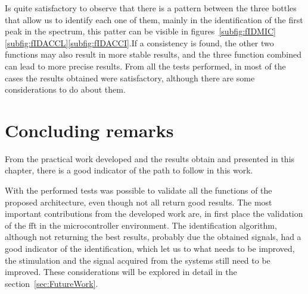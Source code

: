 Is quite satisfactory to observe that there is a pattern between the three bottles that allow us to identify each one of them, mainly in the identification of the first peak in the spectrum, this patter can be visible in figures~\ref{subfig:fIDMIC}\ref{subfig:fIDACCL}\ref{subfig:fIDACCI}.If a consistency is found, the other two functions may also result in more stable results, and the three function combined can lead to more precise results.
From all the tests performed, in most of the cases the results obtained were satisfactory, although there are some considerations to do about them. 

\section{Concluding remarks}
From the practical work developed and the results obtain and presented in this chapter, there is a good indicator of the path to follow in this work.

With the performed tests was possible to validate all the functions of the proposed architecture, even though not all return good results. The most important contributions from the developed work are, in first place the validation of the \acrshort{fft} in the microcontroller environment. The identification algorithm, although not returning the best results, probably due the obtained signals, had a good indicator of the identification, which let us to what needs to be improved, the stimulation and the signal acquired from the systems still need to be improved. These considerations will be explored in detail in the section~\ref{sec:FutureWork}. 
\clearpage
